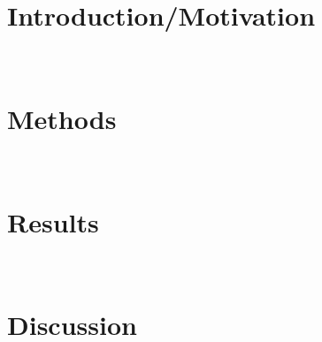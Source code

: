 \newpage
\chapter{Introduction/Motivation}
~\label{ch:Introduction/Motivation}




% 

\newpage
\chapter{Methods}
~\label{ch:Methods}



\newpage
\chapter{Results}
~\label{ch:Results}



\newpage
\chapter{Discussion}
~\label{ch:Discussion}















